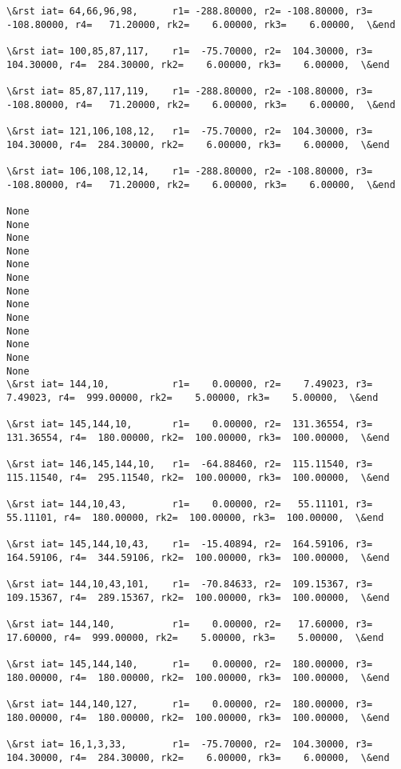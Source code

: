 \documentclass[11pt]{article}
\begin{document}
\begin{Verbatim}[commandchars=\\\{\}]
\&rst iat= 64,66,96,98,      r1= -288.80000, r2= -108.80000, r3= -108.80000, r4=   71.20000, rk2=    6.00000, rk3=    6.00000,  \&end

\&rst iat= 100,85,87,117,    r1=  -75.70000, r2=  104.30000, r3=  104.30000, r4=  284.30000, rk2=    6.00000, rk3=    6.00000,  \&end

\&rst iat= 85,87,117,119,    r1= -288.80000, r2= -108.80000, r3= -108.80000, r4=   71.20000, rk2=    6.00000, rk3=    6.00000,  \&end

\&rst iat= 121,106,108,12,   r1=  -75.70000, r2=  104.30000, r3=  104.30000, r4=  284.30000, rk2=    6.00000, rk3=    6.00000,  \&end

\&rst iat= 106,108,12,14,    r1= -288.80000, r2= -108.80000, r3= -108.80000, r4=   71.20000, rk2=    6.00000, rk3=    6.00000,  \&end

None
None
None
None
None
None
None
None
None
None
None
None
None
\&rst iat= 144,10,           r1=    0.00000, r2=    7.49023, r3=    7.49023, r4=  999.00000, rk2=    5.00000, rk3=    5.00000,  \&end

\&rst iat= 145,144,10,       r1=    0.00000, r2=  131.36554, r3=  131.36554, r4=  180.00000, rk2=  100.00000, rk3=  100.00000,  \&end

\&rst iat= 146,145,144,10,   r1=  -64.88460, r2=  115.11540, r3=  115.11540, r4=  295.11540, rk2=  100.00000, rk3=  100.00000,  \&end

\&rst iat= 144,10,43,        r1=    0.00000, r2=   55.11101, r3=   55.11101, r4=  180.00000, rk2=  100.00000, rk3=  100.00000,  \&end

\&rst iat= 145,144,10,43,    r1=  -15.40894, r2=  164.59106, r3=  164.59106, r4=  344.59106, rk2=  100.00000, rk3=  100.00000,  \&end

\&rst iat= 144,10,43,101,    r1=  -70.84633, r2=  109.15367, r3=  109.15367, r4=  289.15367, rk2=  100.00000, rk3=  100.00000,  \&end

\&rst iat= 144,140,          r1=    0.00000, r2=   17.60000, r3=   17.60000, r4=  999.00000, rk2=    5.00000, rk3=    5.00000,  \&end

\&rst iat= 145,144,140,      r1=    0.00000, r2=  180.00000, r3=  180.00000, r4=  180.00000, rk2=  100.00000, rk3=  100.00000,  \&end

\&rst iat= 144,140,127,      r1=    0.00000, r2=  180.00000, r3=  180.00000, r4=  180.00000, rk2=  100.00000, rk3=  100.00000,  \&end

\&rst iat= 16,1,3,33,        r1=  -75.70000, r2=  104.30000, r3=  104.30000, r4=  284.30000, rk2=    6.00000, rk3=    6.00000,  \&end


\end{Verbatim}
\end{document}
